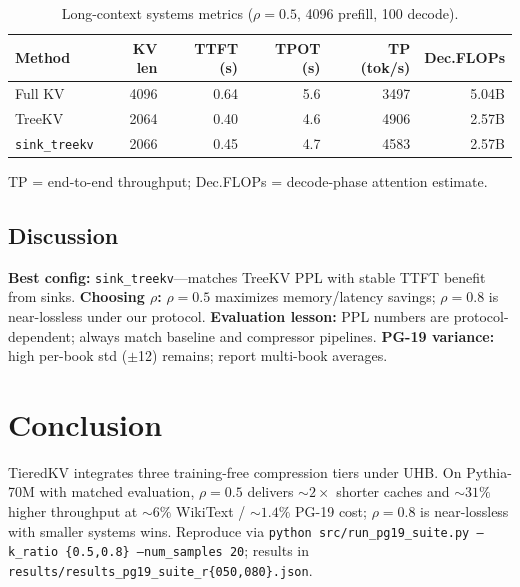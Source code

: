 \documentclass{article}
\begin{document}
\begin{table}[t]
  \centering
  \caption{Long-context systems metrics ($\rho{=}0.5$, 4096 prefill, 100 decode).}
  \label{tab:sys}
  \small
  \setlength{\tabcolsep}{5pt}
  \begin{tabular}{@{}lrrrrr@{}}
    \toprule
    Method & KV len & TTFT (s) & TPOT (s) & TP (tok/s) & Dec.FLOPs \\
    \midrule
    Full KV & 4096 & 0.64 & 5.6 & 3497 & 5.04B \\
    TreeKV & 2064 & 0.40 & 4.6 & 4906 & 2.57B \\
    \texttt{sink\_treekv} & 2066 & 0.45 & 4.7 & 4583 & 2.57B \\
    \bottomrule
  \end{tabular}
  \vspace{2pt}

  {\footnotesize TP = end-to-end throughput; Dec.FLOPs = decode-phase attention estimate.}
\end{table}

\subsection{Discussion}
\textbf{Best config:} \texttt{sink\_treekv}---matches TreeKV PPL with stable TTFT benefit from sinks.
\textbf{Choosing $\rho$:} $\rho{=}0.5$ maximizes memory/latency savings; $\rho{=}0.8$ is near-lossless under our protocol.
\textbf{Evaluation lesson:} PPL numbers are protocol-dependent; always match baseline and compressor pipelines.
\textbf{PG-19 variance:} high per-book std ($\pm$12) remains; report multi-book averages.

\section{Conclusion}
TieredKV integrates three training-free compression tiers under UHB.
On Pythia-70M with matched evaluation, $\rho{=}0.5$ delivers ${\sim}2\times$ shorter caches and ${\sim}31\%$ higher throughput at ${\sim}6\%$ WikiText / ${\sim}1.4\%$ PG-19 cost; $\rho{=}0.8$ is near-lossless with smaller systems wins.
Reproduce via \texttt{python src/run\_pg19\_suite.py --k\_ratio \{0.5,0.8\} --num\_samples 20}; results in \texttt{results/results\_pg19\_suite\_r\{050,080\}.json}.
\end{document}
